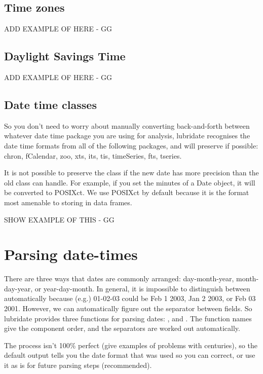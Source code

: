 \documentclass[article]{jss}
\begin{document}
\subsection{Time zones}

ADD EXAMPLE OF HERE - GG

\subsection{Daylight Savings Time}

ADD EXAMPLE OF HERE - GG


\subsection{Date time classes}

So you don't need to worry about manually converting back-and-forth between whatever date time package you are using for analysis, lubridate recognises the date time formats from all of the following packages, and will preserve if possible: chron, fCalendar, zoo, xts, its, tis, timeSeries, fts, tseries.

It is not possible to preserve the class if the new date has more precision than the old class can handle.  For example, if you set the minutes of a Date object, it will be converted to POSIXct.  We use POSIXct by default because it is the format most amenable to storing in data frames.

SHOW EXAMPLE OF THIS - GG

\section{Parsing date-times}
\label{sec:parsing}

There are three ways that dates are commonly arranged: day-month-year, month-day-year, or year-day-month. In general, it is impossible to distinguish between automatically because (e.g.) 01-02-03 could be Feb 1 2003, Jan 2 2003, or Feb 03 2001.  However, we can automatically figure out the separator between fields.  So lubridate provides three functions for parsing dates: ,  and .  The function names give the component order, and the separators are worked out automatically.  

The process isn't 100\% perfect (give examples of problems with centuries), so the default output tells you the date format that was used so you can correct, or use it as is for future parsing steps (recommended).
\end{document}
